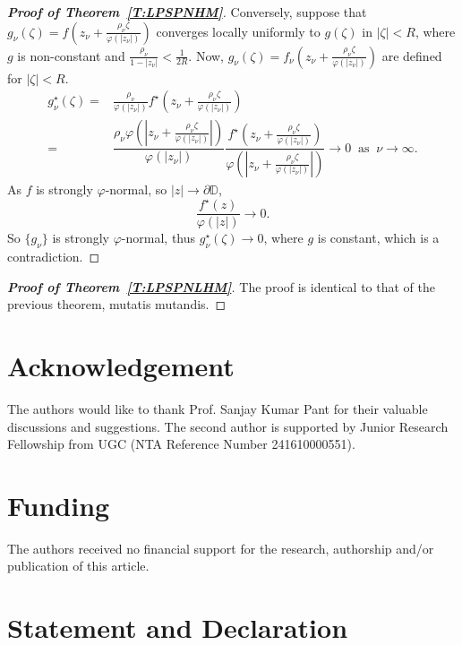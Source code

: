 \documentclass[11pt, reqno]{amsart}
\theoremstyle{definition}
\theoremstyle{remark}
\numberwithin{equation}{section}
\begin{document}
\begin{proof}[{\bf Proof of Theorem~\ref{T:LPSPNHM}}]
Conversely, suppose that $g_{\nu}(\zeta)=f\left(z_{\nu}+\frac{\rho_{\nu} \zeta}{\varphi(|z_{\nu}|)}\right)$ converges locally 
uniformly to $g(\zeta)$ in $|\zeta|<R$, where $g$ is non-constant and $\displaystyle\frac{\rho_{\nu} }{1-|z_{\nu}|}<\frac{1}{2R}$. Now, $g_{\nu}(\zeta)=f_{\nu}\left(z_{\nu}+\frac{\rho_{\nu} \zeta}{\varphi(|z_{\nu}|)}\right)$ are defined for 
$\displaystyle|\zeta|<R$.
\begin{align*}
    g_{\nu}^\star(\zeta)=&\frac{\rho_{\nu} }{\varphi(|z_{\nu}|)}f^\star\left(z_{\nu}+\frac{\rho_{\nu} \zeta}{\varphi(|z_{\nu}|)}\right)\\
    =& \dfrac{\rho_{\nu} \varphi\left(\left|z_{\nu}+\frac{\rho_{\nu} \zeta}{\varphi(|z_{\nu}|)}\right|\right)}{\varphi(|z_{\nu}|)} \dfrac{f^\star\left(z_{\nu}+\frac{\rho_{\nu} \zeta}{\varphi(|z_{\nu}|)}\right)}{\varphi\left(\left|z_{\nu}+\frac{\rho_{\nu} \zeta}{\varphi(|z_{\nu}|)}\right|\right)} \to 0\ \text{ as }\ \nu\to\infty.
\end{align*}
As $f$ is strongly $\varphi$-normal, so $|z|\to\partial\mathbb D$, \begin{equation*}\frac{f^\star(z)}{\varphi(|z|)}\to 0.\end{equation*} 
So $\{g_{\nu}\}$ is strongly $\varphi$-normal, thus $g_{\nu}^\star(\zeta)\to 0$, where $g$ is constant, which is a contradiction. 
\end{proof}
\begin{proof}[{\bf Proof of Theorem~\ref{T:LPSPNLHM}}]
The proof is identical to that of the previous theorem,
mutatis mutandis.
\end{proof}
\section*{Acknowledgement}
The authors would like to thank Prof. Sanjay Kumar Pant for their valuable discussions and suggestions. The second author is supported by Junior Research Fellowship from UGC (NTA Reference Number 241610000551).
\section*{Funding} The authors received no financial support for the research, authorship and/or publication of this article. 
\section*{Statement and Declaration}
\end{document}
